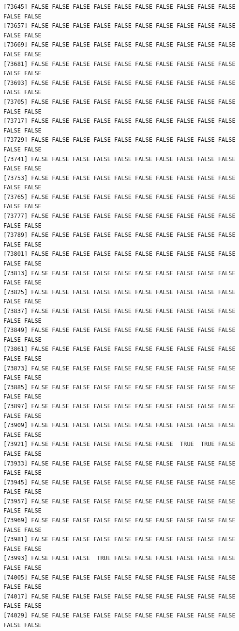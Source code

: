 \documentclass[
  a4paper,
  DIV=11,
  numbers=noendperiod]{scrartcl}
\begin{document}
\begin{verbatim}
[73645] FALSE FALSE FALSE FALSE FALSE FALSE FALSE FALSE FALSE FALSE FALSE FALSE
[73657] FALSE FALSE FALSE FALSE FALSE FALSE FALSE FALSE FALSE FALSE FALSE FALSE
[73669] FALSE FALSE FALSE FALSE FALSE FALSE FALSE FALSE FALSE FALSE FALSE FALSE
[73681] FALSE FALSE FALSE FALSE FALSE FALSE FALSE FALSE FALSE FALSE FALSE FALSE
[73693] FALSE FALSE FALSE FALSE FALSE FALSE FALSE FALSE FALSE FALSE FALSE FALSE
[73705] FALSE FALSE FALSE FALSE FALSE FALSE FALSE FALSE FALSE FALSE FALSE FALSE
[73717] FALSE FALSE FALSE FALSE FALSE FALSE FALSE FALSE FALSE FALSE FALSE FALSE
[73729] FALSE FALSE FALSE FALSE FALSE FALSE FALSE FALSE FALSE FALSE FALSE FALSE
[73741] FALSE FALSE FALSE FALSE FALSE FALSE FALSE FALSE FALSE FALSE FALSE FALSE
[73753] FALSE FALSE FALSE FALSE FALSE FALSE FALSE FALSE FALSE FALSE FALSE FALSE
[73765] FALSE FALSE FALSE FALSE FALSE FALSE FALSE FALSE FALSE FALSE FALSE FALSE
[73777] FALSE FALSE FALSE FALSE FALSE FALSE FALSE FALSE FALSE FALSE FALSE FALSE
[73789] FALSE FALSE FALSE FALSE FALSE FALSE FALSE FALSE FALSE FALSE FALSE FALSE
[73801] FALSE FALSE FALSE FALSE FALSE FALSE FALSE FALSE FALSE FALSE FALSE FALSE
[73813] FALSE FALSE FALSE FALSE FALSE FALSE FALSE FALSE FALSE FALSE FALSE FALSE
[73825] FALSE FALSE FALSE FALSE FALSE FALSE FALSE FALSE FALSE FALSE FALSE FALSE
[73837] FALSE FALSE FALSE FALSE FALSE FALSE FALSE FALSE FALSE FALSE FALSE FALSE
[73849] FALSE FALSE FALSE FALSE FALSE FALSE FALSE FALSE FALSE FALSE FALSE FALSE
[73861] FALSE FALSE FALSE FALSE FALSE FALSE FALSE FALSE FALSE FALSE FALSE FALSE
[73873] FALSE FALSE FALSE FALSE FALSE FALSE FALSE FALSE FALSE FALSE FALSE FALSE
[73885] FALSE FALSE FALSE FALSE FALSE FALSE FALSE FALSE FALSE FALSE FALSE FALSE
[73897] FALSE FALSE FALSE FALSE FALSE FALSE FALSE FALSE FALSE FALSE FALSE FALSE
[73909] FALSE FALSE FALSE FALSE FALSE FALSE FALSE FALSE FALSE FALSE FALSE FALSE
[73921] FALSE FALSE FALSE FALSE FALSE FALSE FALSE  TRUE  TRUE FALSE FALSE FALSE
[73933] FALSE FALSE FALSE FALSE FALSE FALSE FALSE FALSE FALSE FALSE FALSE FALSE
[73945] FALSE FALSE FALSE FALSE FALSE FALSE FALSE FALSE FALSE FALSE FALSE FALSE
[73957] FALSE FALSE FALSE FALSE FALSE FALSE FALSE FALSE FALSE FALSE FALSE FALSE
[73969] FALSE FALSE FALSE FALSE FALSE FALSE FALSE FALSE FALSE FALSE FALSE FALSE
[73981] FALSE FALSE FALSE FALSE FALSE FALSE FALSE FALSE FALSE FALSE FALSE FALSE
[73993] FALSE FALSE FALSE  TRUE FALSE FALSE FALSE FALSE FALSE FALSE FALSE FALSE
[74005] FALSE FALSE FALSE FALSE FALSE FALSE FALSE FALSE FALSE FALSE FALSE FALSE
[74017] FALSE FALSE FALSE FALSE FALSE FALSE FALSE FALSE FALSE FALSE FALSE FALSE
[74029] FALSE FALSE FALSE FALSE FALSE FALSE FALSE FALSE FALSE FALSE FALSE FALSE

\end{verbatim}
\end{document}
